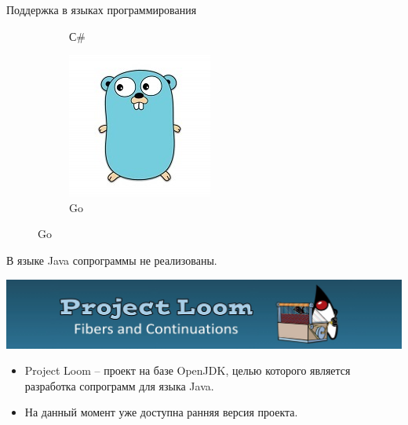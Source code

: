 \begin{frame}{Поддержка в языках программирования}
\begin{figure}
\begin{subfigure}[b]{0.25\linewidth}
		\caption{С\#}
	\end{subfigure}
	\hfill
	\begin{subfigure}[b]{0.27\linewidth}
		\includegraphics[width=\linewidth]{images/go.jpg}
		\caption{Go}
	\end{subfigure}
	
	\end{figure}
	\par
	В языке Java сопрограммы не реализованы.
\end{frame}

\begin{frame}
	\includegraphics[scale=0.5]{images/loom.jpg}
	\begin{itemize}
		\item Project Loom – проект на базе OpenJDK, целью которого является разработка сопрограмм для языка Java. 
		\item На данный момент уже доступна ранняя версия проекта.
	\end{itemize}
\end{frame}

